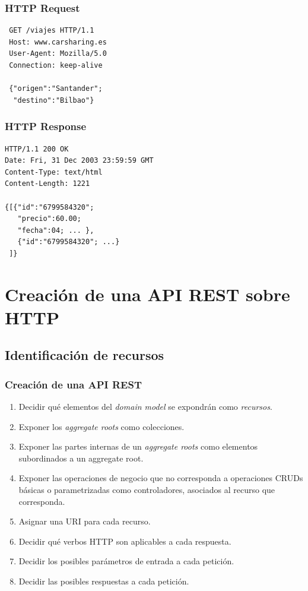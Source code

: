 \documentclass[a4paper,slidestop,xcolor=pst,blue]{beamer}
\begin{document}
\begin{frame}[c,fragile]
    \frametitle{HTTP Request}
\begin{verbatim}
 GET /viajes HTTP/1.1
 Host: www.carsharing.es
 User-Agent: Mozilla/5.0 
 Connection: keep-alive
 
 {"origen":"Santander";
  "destino":"Bilbao"}
\end{verbatim}
\end{frame}

\begin{frame}[c,fragile]
    \frametitle{HTTP Response}
\begin{verbatim}
HTTP/1.1 200 OK
Date: Fri, 31 Dec 2003 23:59:59 GMT
Content-Type: text/html
Content-Length: 1221

{[{"id":"6799584320";
   "precio":60.00;
   "fecha":04; ... },
   {"id":"6799584320"; ...}
 ]}  
\end{verbatim}
\end{frame}

\section{Creación de una API REST sobre HTTP}

\subsection{Identificación de recursos}

\begin{frame}[c]
    \frametitle{Creación de una API REST}
    \begin{enumerate}[<+->]
        \item Decidir qué elementos del \emph{domain model} se expondrán como \emph{recursos}.
        \item Exponer los \emph{aggregate roots} como colecciones.
        \item Exponer las partes internas de un \emph{aggregate roots} como elementos subordinados a un aggregate root.
        \item Exponer las operaciones de negocio que no corresponda a operaciones CRUDs básicas o parametrizadas como controladores, asociados al recurso que corresponda.
        \item Asignar una URI para cada recurso.
        \item Decidir qué verbos HTTP son aplicables a cada respuesta.
        \item Decidir los posibles parámetros de entrada a cada petición.
        \item Decidir las posibles respuestas a cada petición.
    \end{enumerate}
\end{frame}
\end{document}
